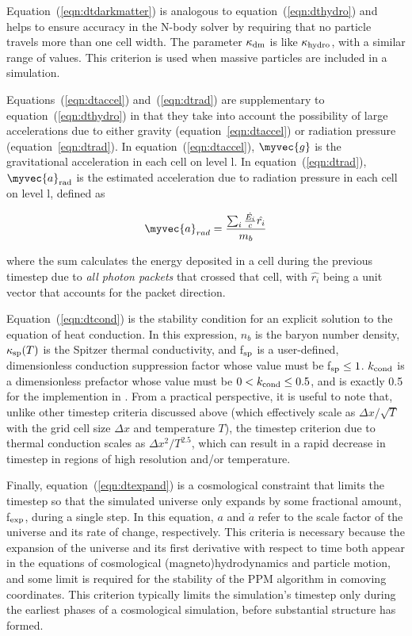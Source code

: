 Equation~(\ref{eqn:dtdarkmatter}) is analogous to
equation~(\ref{eqn:dthydro}) and helps to ensure accuracy in the
N-body solver by requiring that no particle travels more than one cell
width.  The parameter $\kappa_{\rm dm}$ is like $\kappa_{\rm hydro}$,
with a similar range of values.  This criterion is used when massive
particles are included in a simulation.

Equations~(\ref{eqn:dtaccel}) and~(\ref{eqn:dtrad}) are supplementary
to equation~(\ref{eqn:dthydro}) in that they take into account the
possibility of large accelerations due to either gravity
(equation~\ref{eqn:dtaccel}) or radiation pressure
(equation~\ref{eqn:dtrad}).  In equation~(\ref{eqn:dtaccel}),
$\myvec{g}$ is the gravitational acceleration in each cell on level l.
In equation~(\ref{eqn:dtrad}), $\myvec{a}_{\rm rad}$ is the estimated
acceleration due to radiation pressure in each cell on level l,
defined as

\begin{equation}
\myvec{a}_{rad} = \frac{ \sum_i \frac{\dot{E_i}}{c} \hat{r_i} }{m_b} 
\end{equation}

where the sum calculates the energy deposited in a cell during the
previous timestep due to \textit{all photon packets} that crossed that
cell, with $\hat{r_i}$ being a unit vector that accounts for the
packet direction.

Equation~(\ref{eqn:dtcond}) is the stability condition for an explicit
solution to the equation of heat conduction.  In this expression,
$n_b$ is the baryon number density, $\kappa_{\rm sp}(T)$ is the
Spitzer thermal conductivity, and f$_{\rm sp}$ is a user-defined,
dimensionless conduction suppression factor whose value must be
f$_{\rm sp} \leq 1$.  $k_{\rm cond}$ is a dimensionless prefactor
whose value must be $0 < k_{\rm cond} \leq 0.5$, and is exactly 0.5
for the implemention in \enzo.  From a practical perspective, it is
useful to note that, unlike other timestep criteria discussed above
(which effectively scale as $\Delta x / \sqrt{T}$ with the grid cell
size $\Delta x$ and temperature $T$), the timestep criterion due to
thermal conduction scales as $\Delta x^2 / T^{2.5}$, which can result
in a rapid decrease in timestep in regions of high resolution and/or
temperature.

Finally, equation~(\ref{eqn:dtexpand}) is a cosmological constraint
that limits the timestep so that the simulated universe only expands
by some fractional amount, f$_{\rm exp}$, during a single step.  In
this equation, $a$ and $\dot{a}$ refer to the scale factor of the
universe and its rate of change, respectively.  This criteria is
necessary because the expansion of the universe and its first
derivative with respect to time both appear in the equations of
cosmological (magneto)hydrodynamics and particle motion, and some
limit is required for the stability of the PPM algorithm in comoving
coordinates.  This criterion typically limits the simulation's
timestep only during the earliest phases of a cosmological simulation,
before substantial structure has formed.
